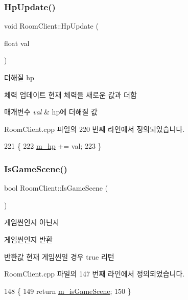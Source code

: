 \subsubsection{\texorpdfstring{Hp\+Update()}{HpUpdate()}}
{\footnotesize\ttfamily void Room\+Client\+::\+Hp\+Update (\begin{DoxyParamCaption}\item[{float}]{val }\end{DoxyParamCaption})}



더해질 hp 

체력 업데이트  현재 체력을 새로운 값과 더함


\begin{DoxyParams}{매개변수}
{\em val} & hp에 더해질 값 \\
\hline
\end{DoxyParams}


Room\+Client.\+cpp 파일의 220 번째 라인에서 정의되었습니다.


\begin{DoxyCode}
221 \{
222     \hyperlink{class_room_client_a2b4f07062f9927aa30772306a1b9d18a}{m\_hp} += val;
223 \}
\end{DoxyCode}
\mbox{\label{class_room_client_ad906becf30abca17614ca70f00a3aa28}} 
\subsubsection{\texorpdfstring{Is\+Game\+Scene()}{IsGameScene()}}
{\footnotesize\ttfamily bool Room\+Client\+::\+Is\+Game\+Scene (\begin{DoxyParamCaption}{ }\end{DoxyParamCaption})}



게임씬인지 아닌지 

게임씬인지 반환

\begin{DoxyReturn}{반환값}
현재 게임씬일 경우 true 리턴 
\end{DoxyReturn}


Room\+Client.\+cpp 파일의 147 번째 라인에서 정의되었습니다.


\begin{DoxyCode}
148 \{
149     \textcolor{keywordflow}{return} \hyperlink{class_room_client_a491106d1b6fbf97fd76a7d1449bf5de9}{m\_isGameScene}; 
150 \}
\end{DoxyCode}
\mbox{\label{class_room_client_a5e79fbf09ee0f8c5ed9500116fe04fb2}} 
